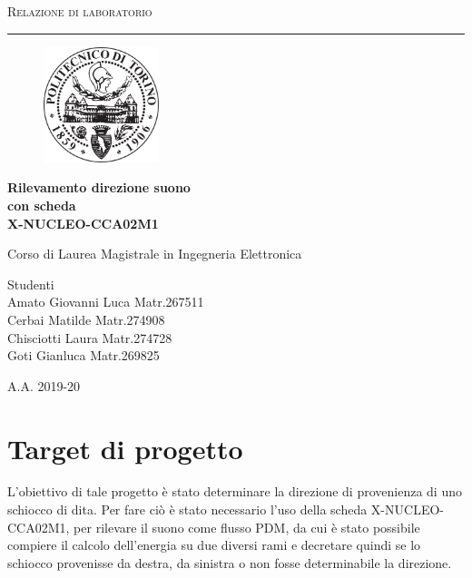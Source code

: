 \documentclass[a4paper, titlepage]{article}
\begin{document}
\begin{titlepage}
	\centering
	{\scshape\Large Relazione di laboratorio\par}
	\vspace{0.7 cm}
	\hrule
	\vspace{1.2 cm}
	\begin{figure}[!h]
	    \centering
	    \includegraphics[width=0.30\textwidth]{Politecnico_di_Torino_-_Logo}
	\end{figure}
	
		\vspace{1 cm}
	{\huge\bfseries Rilevamento direzione suono\\ con scheda\\  X-NUCLEO-CCA02M1 \par}
	
	\vspace{2 cm}
	Corso di Laurea Magistrale in Ingegneria Elettronica\par
	\null
	\vfill
	{\raggedright\small Studenti\\\large  Amato Giovanni Luca Matr.267511	\\Cerbai Matilde Matr.274908 \\Chisciotti Laura Matr.274728\\Goti Gianluca Matr.269825\par}
	\vspace{0.2 cm}

	\vfill
	{\large A.A. 2019-20}
\end{titlepage}
\newpage
\tableofcontents
\newpage
\section{Target di progetto}
L'obiettivo di tale progetto è stato determinare la direzione di provenienza di uno schiocco di dita. Per fare ciò è stato necessario l'uso della scheda X-NUCLEO-CCA02M1, per rilevare il suono come flusso PDM, da cui è stato possibile compiere il calcolo dell'energia su due diversi rami e decretare quindi se lo schiocco provenisse da destra, da sinistra o non fosse determinabile la direzione.
\end{document}
